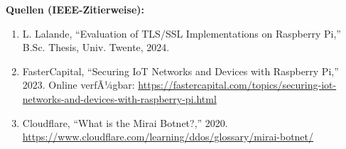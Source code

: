 ﻿\documentclass[a4paper,12pt]{article}
\begin{document}
\bigskip
\textbf{Quellen (IEEE-Zitierweise):}
{\renewcommand{\labelenumi}{[\arabic*]}%
\begin{enumerate}
    \item L. Lalande, ``Evaluation of TLS/SSL Implementations on Raspberry Pi,'' B.Sc. Thesis, Univ. Twente, 2024.
    \item FasterCapital, ``Securing IoT Networks and Devices with Raspberry Pi,'' 2023. Online verfÃ¼gbar: \url{https://fastercapital.com/topics/securing-iot-networks-and-devices-with-raspberry-pi.html}
    \item Cloudflare, ``What is the Mirai Botnet?,'' 2020. \url{https://www.cloudflare.com/learning/ddos/glossary/mirai-botnet/}
\end{enumerate}
}
\end{document}
